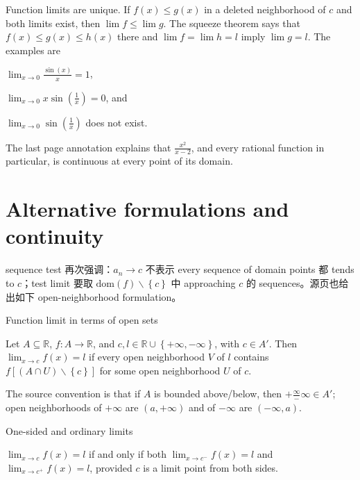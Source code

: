 Function limits are unique. If \(f(x) \leq g(x)\) in a deleted neighborhood of \(c\) and both limits exist, then \(\lim f \leq \lim g\). The squeeze theorem says that \(f(x) \leq g(x) \leq h(x)\) there and \(\lim f = \lim h = l\) imply \(\lim g = l\). The examples are

\(\lim_{x\rightarrow 0}\frac{\sin(x)}{x} = 1\),

\(\lim_{x\rightarrow 0}x\sin\left( \frac{1}{x} \right) = 0\), and

\(\lim_{x\rightarrow 0}\sin\left( \frac{1}{x} \right)\) does not exist.

The last page annotation explains that \(\frac{x^{2}}{x - 2}\), and every rational function in particular, is continuous at every point of its domain.

\section{Alternative formulations and continuity}

sequence test 再次强调：\(a_{n}\rightarrow c\) 不表示 every sequence of domain points 都 tends to \(c\)；test limit 要取 \(\text{dom}(f) \smallsetminus \left\{ c \right\}\) 中 approaching \(c\) 的 sequences。源页也给出如下 open-neighborhood formulation。

\begin{definition}{Function limit in terms of open sets}

Let \(A \subseteq \mathbb{R}\), \(f:A\rightarrow\mathbb{R}\), and \(c,l \in \mathbb{R} \cup \left\{ {+ \infty, - \infty} \right\}\), with \(c \in A'\). Then \(\lim_{x\rightarrow c}f(x) = l\) if every open neighborhood \(V\) of \(l\) contains \(f\left\lbrack {\left( {A \cap U} \right) \smallsetminus \left\{ c \right\}} \right\rbrack\) for some open neighborhood \(U\) of \(c\).

\end{definition}

The source convention is that if \(A\) is bounded above/below, then \(+ \frac{\infty}{-}\infty \in A'\); open neighborhoods of \(+ \infty\) are \(\left( {a, + \infty} \right)\) and of \(- \infty\) are \(\left( {- \infty,a} \right)\).

\begin{theorem}{One-sided and ordinary limits}

\(\lim_{x\rightarrow c}f(x) = l\) if and only if both \(\lim_{x\rightarrow c^{-}}f(x) = l\) and \(\lim_{x\rightarrow c^{+}}f(x) = l\), provided \(c\) is a limit point from both sides.

\end{theorem}

